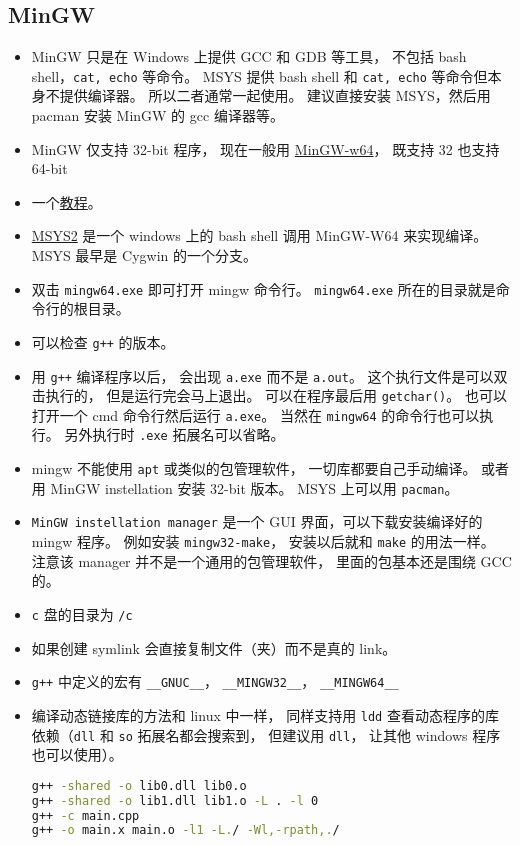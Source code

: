 \subsection{MinGW}
\begin{itemize}
\item MinGW 只是在 Windows 上提供 GCC 和 GDB 等工具， 不包括 bash shell，\verb`cat, echo` 等命令。 MSYS 提供 bash shell 和 \verb`cat, echo` 等命令但本身不提供编译器。 所以二者通常一起使用。 建议直接安装 MSYS，然后用 pacman 安装 MinGW 的 gcc 编译器等。
\item MinGW 仅支持 32-bit 程序， 现在一般用 \href{https://www.mingw-w64.org/}{MinGW-w64}， 既支持 32 也支持 64-bit
\item 一个\href{https://www3.ntu.edu.sg/home/ehchua/programming/howto/Cygwin_HowTo.html}{教程}。
\item \href{https://www.msys2.org/}{MSYS2} 是一个 windows 上的 bash shell 调用 MinGW-W64 来实现编译。 MSYS 最早是 Cygwin 的一个分支。
\item 双击 \verb|mingw64.exe| 即可打开 mingw 命令行。 \verb|mingw64.exe| 所在的目录就是命令行的根目录。
\item 可以检查 \verb|g++| 的版本。
\item 用 \verb|g++| 编译程序以后， 会出现 \verb|a.exe| 而不是 \verb|a.out|。 这个执行文件是可以双击执行的， 但是运行完会马上退出。 可以在程序最后用 \verb|getchar()|。 也可以打开一个 cmd 命令行然后运行 \verb|a.exe|。 当然在 \verb|mingw64| 的命令行也可以执行。 另外执行时 \verb|.exe| 拓展名可以省略。
\item mingw 不能使用 \verb|apt| 或类似的包管理软件， 一切库都要自己手动编译。 或者用 MinGW instellation 安装 32-bit 版本。 MSYS 上可以用 \verb|pacman|。
\item \verb|MinGW instellation manager| 是一个 GUI 界面，可以下载安装编译好的 mingw 程序。 例如安装 \verb|mingw32-make|， 安装以后就和 \verb|make| 的用法一样。 注意该 manager 并不是一个通用的包管理软件， 里面的包基本还是围绕 GCC 的。
\item \verb|c| 盘的目录为 \verb|/c|
\item 如果创建 symlink 会直接复制文件（夹）而不是真的 link。
\item \verb|g++| 中定义的宏有 \verb|__GNUC__|， \verb|__MINGW32__|， \verb|__MINGW64__|
\item 编译动态链接库的方法和 linux 中一样， 同样支持用 \verb|ldd| 查看动态程序的库依赖（\verb|dll| 和 \verb|so| 拓展名都会搜索到， 但建议用 \verb|dll|， 让其他 windows 程序也可以使用）。
\begin{lstlisting}[language=bash]
g++ -shared -o lib0.dll lib0.o
g++ -shared -o lib1.dll lib1.o -L . -l 0
g++ -c main.cpp
g++ -o main.x main.o -l1 -L./ -Wl,-rpath,./
\end{lstlisting}
\end{itemize}

